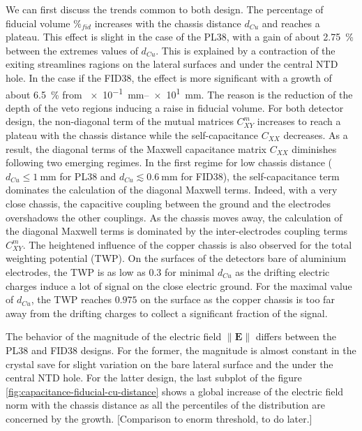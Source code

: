 We can first discuss the trends common to both design. 
The percentage of fiducial volume $\%_{fid}$ increases with the chassis distance $d_{Cu}$ and reaches a plateau. This effect is slight in the case of the PL38, with a gain of about \SI{2.75}{\percent} between the extremes values of $d_{Cu}$. This is explained by a contraction of the exiting streamlines ragions on the lateral surfaces and under the central NTD hole. In the case if the FID38, the effect is more significant with a growth of about \SI{6.5}{\percent} from \SIrange{e-1}{e1}{\mm}. The reason is the reduction of the depth of the veto regions inducing a raise in fiducial volume.
For both detector design, the non-diagonal term of the mutual matrices $C_{XY}^m$ increases to reach a plateau with the chassis distance while the self-capacitance $C_{XX}$ decreases. As a result, the diagonal terms of the Maxwell capacitance matrix $C_{XX}$ diminishes following two emerging regimes. In the first regime for low chassis distance ($d_{Cu} \leq \SI{1}{\mm}$ for PL38 and $d_{Cu} \lesssim \SI{0.6}{\mm}$ for FID38), the self-capacitance term dominates the calculation of the diagonal Maxwell terms. Indeed, with a very close chassis, the capacitive coupling between the ground and the electrodes overshadows the other couplings. As the chassis moves away, the calculation of the diagonal Maxwell terms is dominated by the inter-electrodes coupling terms $C_{XY}^m$. 
The heightened influence of the copper chassis is also observed for the total weighting potential (TWP). On the surfaces of the detectors bare of aluminium electrodes, the TWP is as low as $0.3$ for minimal $d_{Cu}$ as the drifting electric charges induce a lot of signal on the close electric ground. For the maximal value of $d_{Cu}$, the TWP reaches $0.975$ on the surface as the copper chassis is too far away from the drifting charges to collect a significant fraction of the signal.

The behavior of the magnitude of the electric field $\| \mathbf{E} \|$ differs between the PL38 and FID38 designs. For the former, the magnitude is almost constant in the crystal save for slight variation on the bare lateral surface and the under the central NTD hole. For the latter design, the last subplot of the figure \ref{fig:capacitance-fiducial-cu-distance} shows a global increase of the electric field norm with the chassis distance as all the percentiles of the distribution are concerned by the growth.
{\color{red} [Comparison to enorm threshold, to do later.]}

